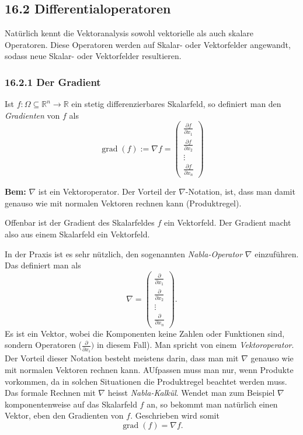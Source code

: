 \documentclass[a4paper,landscape,8pt]{extarticle}
\newcommand{\R}{\mathbb{R}}
\newcommand{\Bem}{\textbf{Bem: }}
\DeclareMathOperator{\grad}{grad}
\begin{document}
\begin{multicols*}{4}
\subsection{16.2 Differentialoperatoren}

Natürlich kennt die Vektoranalysis sowohl vektorielle als auch skalare
Operatoren. Diese Operatoren werden auf Skalar- oder Vektorfelder angewandt,
sodass neue Skalar- oder Vektorfelder resultieren.

\subsubsection{16.2.1 Der Gradient}

\Def Ist $f\colon\Omega\subseteq\R^n\to\R$ ein stetig differenzierbares
Skalarfeld, so definiert man den \emph{Gradienten} von $f$ als
\[
\grad(f) := \nabla f = \begin{pmatrix}
\frac{\partial f}{\partial x_1}\\
\frac{\partial f}{\partial x_2}\\
\vdots\\
\frac{\partial f}{\partial x_n}
\end{pmatrix}
\]

\Bem $\nabla$ ist ein Vektoroperator. Der Vorteil der $\nabla$-Notation, ist,
dass man damit genauso wie mit normalen Vektoren rechnen kann (Produktregel).

\begin{warmup}
Offenbar ist der Gradient des Skalarfeldes $f$ ein Vektorfeld. Der Gradient
macht also aus einem Skalarfeld ein Vektorfeld.

In der Praxis ist es sehr nützlich, den sogenannten \emph{Nabla-Operator}
$\nabla$ einzuführen. Das definiert man als
\[
\nabla = \begin{pmatrix}
\frac{\partial}{\partial x_1}\\
\frac{\partial}{\partial x_2}\\
\vdots\\
\frac{\partial}{\partial x_n}
\end{pmatrix}.
\]
Es ist ein Vektor, wobei die Komponenten keine Zahlen oder Funktionen sind,
sondern Operatoren ($\frac{\partial}{\partial x_i})$ in diesem Fall). Man
spricht von einem \emph{Vektoroperator}. Der Vorteil dieser Notation besteht
meistens darin, dass man mit $\nabla$ genauso wie mit normalen Vektoren rechnen
kann. AUfpassen muss man nur, wenn Produkte vorkommen, da in solchen Situationen
die Produktregel beachtet werden muss. Das formale Rechnen mit $\nabla$ heisst
\emph{Nabla-Kalkül}. Wendet man zum Beispiel $\nabla$ komponentenweise auf das
Skalarfeld $f$ an, so bekommt man natürlich einen Vektor, eben den Gradienten
von $f$. Geschrieben wird somit
\[
\grad(f) =  \nabla f.
\]
\end{warmup}


\end{multicols*}
\end{document}
